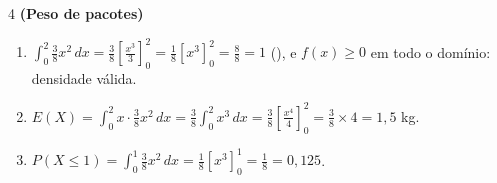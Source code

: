\documentclass[11pt]{article}
\begin{document}
\begin{questao}{4} \textbf{(Peso de pacotes)}
\begin{solucao}
\begin{enumerate}[label=(\alph*)]
  \item $\displaystyle\int_0^2 \frac38 x^2\,dx = \frac38\left[\frac{x^3}{3}\right]_0^2 =
    \frac18\left[x^3\right]_0^2 = \frac{8}{8}=1$ (\checkmark), e $f(x)\ge0$ em todo o domínio: densidade
    válida.
  \item $\displaystyle E(X) = \int_0^2 x\cdot\frac38 x^2\,dx = \frac38\int_0^2 x^3\,dx =
    \frac38\left[\frac{x^4}{4}\right]_0^2 = \frac38\times4 = 1{,}5$ kg.
  \item $\displaystyle P(X\le1) = \int_0^1 \frac38 x^2\,dx = \frac18\left[x^3\right]_0^1 =
    \frac18=0{,}125$.
\end{enumerate}
\end{solucao}
\end{questao}
\end{document}
